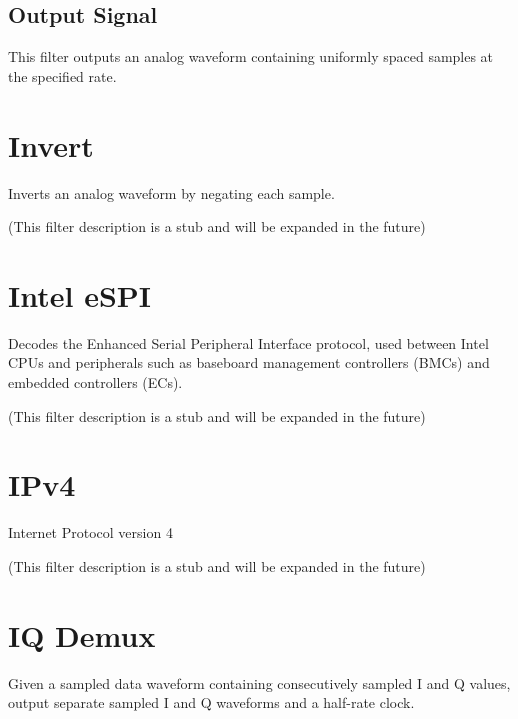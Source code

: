 \subsection{Output Signal}

This filter outputs an analog waveform containing uniformly spaced samples at the specified rate.

\pagebreak
\section{Invert}
\label{filter:invert}

Inverts an analog waveform by negating each sample.

(This filter description is a stub and will be expanded in the future)

\pagebreak
\section{Intel eSPI}

Decodes the Enhanced Serial Peripheral Interface protocol, used between Intel CPUs and peripherals such as baseboard
management controllers (BMCs) and embedded controllers (ECs).

(This filter description is a stub and will be expanded in the future)

\pagebreak
\section{IPv4}

Internet Protocol version 4

(This filter description is a stub and will be expanded in the future)

\pagebreak
\section{IQ Demux}
\label{filter:iqdemux}

Given a sampled data waveform containing consecutively sampled I and Q values, output separate
sampled I and Q waveforms and a half-rate clock.

